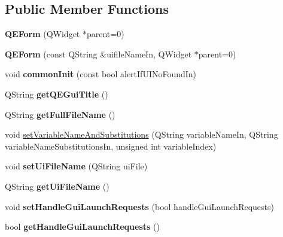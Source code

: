 \subsection*{Public Member Functions}
\begin{DoxyCompactItemize}
\item 
\hypertarget{classQEForm_a0e6f14b44a0c0e6a078f2a18f80357ad}{
{\bfseries QEForm} (QWidget $\ast$parent=0)}
\label{classQEForm_a0e6f14b44a0c0e6a078f2a18f80357ad}

\item 
\hypertarget{classQEForm_a0354e7c1f7e0e65356672d672dbc0e7a}{
{\bfseries QEForm} (const QString \&uifileNameIn, QWidget $\ast$parent=0)}
\label{classQEForm_a0354e7c1f7e0e65356672d672dbc0e7a}

\item 
\hypertarget{classQEForm_a53b4905399cc6216d25ccccf1d1e601a}{
void {\bfseries commonInit} (const bool alertIfUINoFoundIn)}
\label{classQEForm_a53b4905399cc6216d25ccccf1d1e601a}

\item 
\hypertarget{classQEForm_a6d37ea8ea852cbc0f38fdc3963dcb5ac}{
QString {\bfseries getQEGuiTitle} ()}
\label{classQEForm_a6d37ea8ea852cbc0f38fdc3963dcb5ac}

\item 
\hypertarget{classQEForm_a33ff3ace545c79ac40b935b03f4ffdc2}{
QString {\bfseries getFullFileName} ()}
\label{classQEForm_a33ff3ace545c79ac40b935b03f4ffdc2}

\item 
void \hyperlink{classQEForm_a2c6278bcd9006668e46165459015dfc5}{setVariableNameAndSubstitutions} (QString variableNameIn, QString variableNameSubstitutionsIn, unsigned int variableIndex)
\item 
\hypertarget{classQEForm_ae3152e9575274af7769470e5d5aeed4e}{
void {\bfseries setUiFileName} (QString uiFile)}
\label{classQEForm_ae3152e9575274af7769470e5d5aeed4e}

\item 
\hypertarget{classQEForm_aaccca0f00629ad77474096933b299a34}{
QString {\bfseries getUiFileName} ()}
\label{classQEForm_aaccca0f00629ad77474096933b299a34}

\item 
\hypertarget{classQEForm_ae564fdbeb6cf6f603f6f014bf85a3ad9}{
void {\bfseries setHandleGuiLaunchRequests} (bool handleGuiLaunchRequests)}
\label{classQEForm_ae564fdbeb6cf6f603f6f014bf85a3ad9}

\item 
\hypertarget{classQEForm_a8dcc30a21f0b92949c9ef330d5be33a9}{
bool {\bfseries getHandleGuiLaunchRequests} ()}
\label{classQEForm_a8dcc30a21f0b92949c9ef330d5be33a9}


\end{DoxyCompactItemize}
